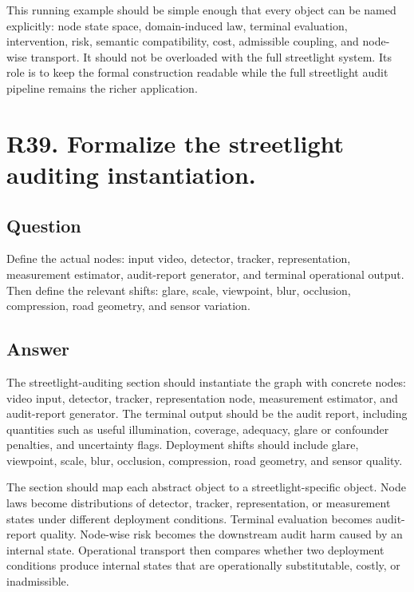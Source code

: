 \documentclass[11pt,a4paper]{article}
\begin{document}
This running example should be simple enough that every object can be named explicitly: node state space, domain-induced law, terminal evaluation, intervention, risk, semantic compatibility, cost, admissible coupling, and node-wise transport. It should not be overloaded with the full streetlight system. Its role is to keep the formal construction readable while the full streetlight audit pipeline remains the richer application.

\section*{R39. Formalize the streetlight auditing instantiation.}

\subsection*{Question}

Define the actual nodes: input video, detector, tracker, representation, measurement estimator, audit-report generator, and terminal operational output. Then define the relevant shifts: glare, scale, viewpoint, blur, occlusion, compression, road geometry, and sensor variation.

\subsection*{Answer}

The streetlight-auditing section should instantiate the graph with concrete nodes: video input, detector, tracker, representation node, measurement estimator, and audit-report generator. The terminal output should be the audit report, including quantities such as useful illumination, coverage, adequacy, glare or confounder penalties, and uncertainty flags. Deployment shifts should include glare, viewpoint, scale, blur, occlusion, compression, road geometry, and sensor quality.

The section should map each abstract object to a streetlight-specific object. Node laws become distributions of detector, tracker, representation, or measurement states under different deployment conditions. Terminal evaluation becomes audit-report quality. Node-wise risk becomes the downstream audit harm caused by an internal state. Operational transport then compares whether two deployment conditions produce internal states that are operationally substitutable, costly, or inadmissible.
\end{document}
